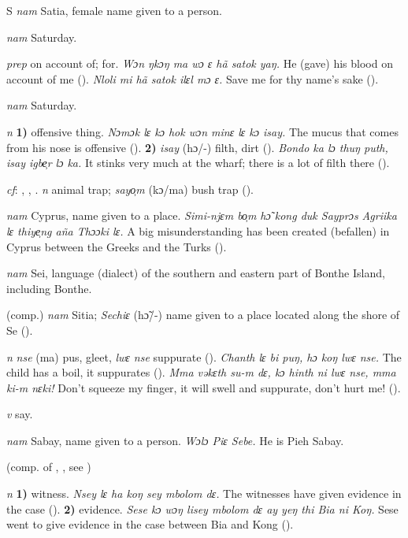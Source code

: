 \begin{letter}{S}
 \textit{nam} Satia, female name given to a person.

 \textit{nam} Saturday.

 \textit{prep} on account of; for. \textit{Wɔn ŋkɔŋ ma wɔ ɛ hã satok yaŋ.} He (gave) his blood on account of me (\citealt{Pichl1967}). \textit{Nloli mi hã satok ilɛl mɔ ɛ.} Save me for thy name's sake (\citealt{Pichl1967}). 

 \textit{nam} Saturday.

 \textit{n} \textbf{1)} offensive thing. \textit{Nɔmɔk lɛ kɔ hok wɔn minɛ lɛ kɔ isay.} The mucus that comes from his nose is offensive (\citealt{Pichl1967}). \textbf{2)} \textit{isay} (hɔ/-) filth, dirt (\citealt{Pichl1967}). \textit{Bondo ka lɔ thuŋ puth, isay igbe̹r lɔ ka.} It stinks very much at the wharf; there is a lot of filth there (\citealt{Pichl1967}). 

 \textit{cf}: , , . \textit{n} animal trap; \textit{sayo̹m} (kɔ/ma) bush trap (\citealt{Pichl1967}). 

 \textit{nam} Cyprus, name given to a place. \textit{Simi-njɛm bo̹m hɔ̃ kong duk Sayprɔs Agriika lɛ thiye̹ng aña Thɔɔki lɛ.} A big misunderstanding has been created (befallen) in Cyprus between the Greeks and the Turks (\citealt{Pichl1967}). 

 \textit{nam} Sei, language (dialect) of the southern and eastern part of Bonthe Island, including Bonthe. 

 (comp.) \textit{nam} Sitia; \textit{Sechiɛ} (hɔ̃/-) name given to a place located along the shore of Se (\citealt{Pichl1967}). 

 \textit{n} \textit{nse} (ma) pus, gleet, \textit{lwɛ nse} suppurate (\citealt{Pichl1967}). \textit{Chanth lɛ bi puŋ, hɔ koŋ lwɛ nse.} The child has a boil, it suppurates (\citealt{Pichl1967}). \textit{Mma vəkɛth su-m dɛ, kɔ hinth ni lwɛ nse, mma ki-m nɛki!} Don't squeeze my finger, it will swell and suppurate, don't hurt me! (\citealt{Pichl1967}). 

 \textit{v} say.

 \textit{nam} Sabay, name given to a person. \textit{Wɔlɔ Piɛ Sebe.} He is Pieh Sabay.

 (comp. of , , see ) 

 \textit{n} \textbf{1)} witness. \textit{Nsey lɛ ha koŋ sey mbolom dɛ.} The witnesses have given evidence in the case (\citealt{Pichl1967}). \textbf{2)} evidence. \textit{Sese kɔ wɔŋ lisey mbolom dɛ ay yeŋ thi Bia ni Koŋ.} Sese went to give evidence in the case between Bia and Kong (\citealt{Pichl1967}). 


\end{letter}
